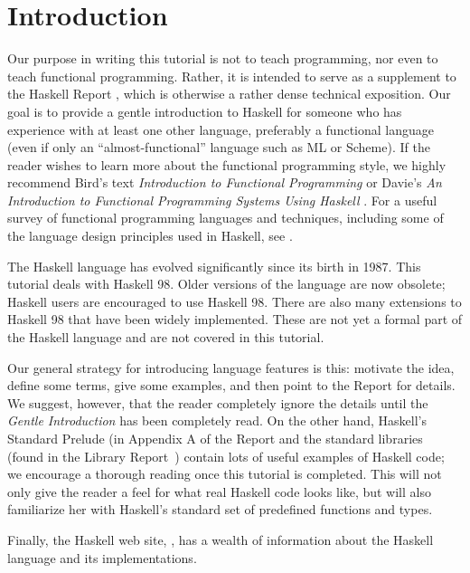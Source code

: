 
\section{Introduction}
\label{tut-intro}

Our purpose in writing this tutorial is not to teach programming, nor
even to teach functional programming.  Rather, it is intended to serve
as a supplement to the Haskell Report \cite{haskell-98}, which is
otherwise a rather dense technical exposition.  Our goal is to provide
a gentle introduction to Haskell for someone who has experience with
at least one other language, preferably a functional language (even if
only an ``almost-functional'' language such as ML or Scheme).
If the
reader wishes to learn more about the functional programming style, we
highly recommend Bird's text {\em Introduction to
Functional Programming} \cite{bird98} or Davie's {\em An Introduction
to Functional Programming Systems Using Haskell} \cite{davie92}. 
For a useful survey of functional programming languages
and techniques, including some of the language design principles used
in Haskell, see \cite{huda89a}.

The Haskell language has evolved significantly since its birth in 1987.
This tutorial deals with 
{Haskell 98}.  Older versions of the language are now obsolete;
Haskell users are encouraged to use Haskell 98.  There are also many
extensions to Haskell 98 that have been widely implemented.  These are
not yet a formal part of the Haskell language and are not covered in
this tutorial.

Our general strategy for introducing language features is this:
motivate the idea, define some terms, give some examples, and then
point to the Report for details.  We suggest, however, that the reader
completely ignore the details until the {\em Gentle Introduction} has been
completely read.  On the other hand, Haskell's Standard Prelude (in
Appendix A of the Report and the standard libraries
(found in the 
Library Report~\cite{haskell-libs}) contain
lots of useful examples of Haskell code; we 
encourage a thorough reading once this tutorial is completed.  This
will not only give the reader a feel for what real Haskell code looks
like, but will also familiarize her with Haskell's standard set of
predefined functions and types.

Finally, the Haskell web site, , has a wealth of information about the Haskell
language and its implementations.  


